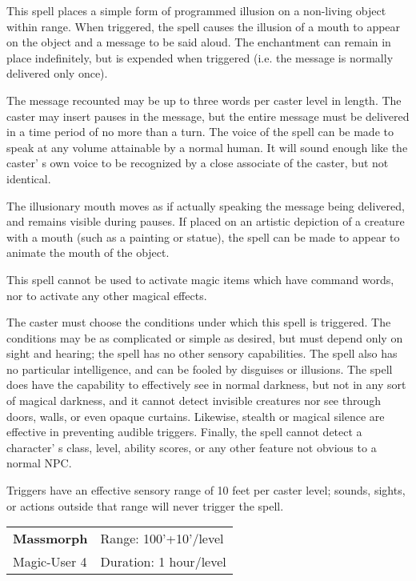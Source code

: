 \documentclass[a4paper,twoside,openany,10pt]{book}
\begin{document}
\begin{multicols}{2}
This spell places a simple form of programmed illusion on a non-living object within range. When triggered, the spell causes the illusion of a mouth to appear on the object and a message to be said aloud. The enchantment can remain in place indefinitely, but is expended when triggered (i.e. the message is normally delivered only once).

The message recounted may be up to three words per caster level in length. The caster may insert pauses in the message, but the entire message must be delivered in a time period of no more than a turn. The voice of the spell can be made to speak at any volume attainable by a normal human. It will sound enough like the caster' s own voice to be recognized by a close associate of the caster, but not identical.

The illusionary mouth moves as if actually speaking the message being delivered, and remains visible during pauses. If placed on an artistic depiction of a creature with a mouth (such as a painting or statue), the spell can be made to appear to animate the mouth of the object.

This spell cannot be used to activate magic items which have command words, nor to activate any other magical effects.

The caster must choose the conditions under which this spell is triggered. The conditions may be as complicated or simple as desired, but must depend only on sight and hearing; the spell has no other sensory capabilities. The spell also has no particular intelligence, and can be fooled by disguises or illusions. The spell does have the capability to effectively see in normal darkness, but not in any sort of magical darkness, and it cannot detect invisible creatures nor see through doors, walls, or even opaque curtains. Likewise, stealth or magical silence are effective in preventing audible triggers. Finally, the spell cannot detect a character' s class, level, ability scores, or any other feature not obvious to a normal NPC.

Triggers have an effective sensory range of 10 feet per caster level; sounds, sights, or actions outside that range will never trigger the spell.


\smallskip\begin{flushleft} 
	\begin{tabularx}{0.45\textwidth}{@{}m{3.5cm}m{5.5cm}@{}} 
		\textbf{Massmorph} & Range: 100'+10'/level\\
Magic-User 4 &Duration: 1 hour/level\\
	\end{tabularx}\end{flushleft}


\end{multicols}
\end{document}
